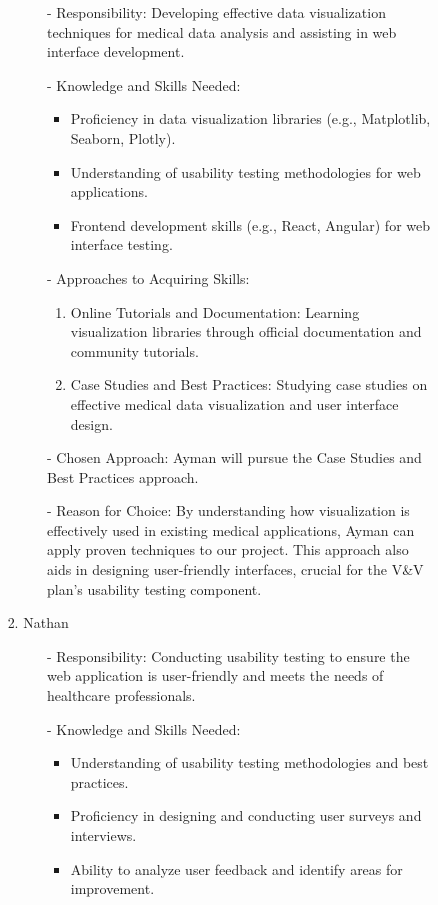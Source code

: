 \documentclass[12pt, titlepage]{article}
\begin{document}
\begin{enumerate}
\begin{enumerate}
\begin{enumerate}
\begin{enumerate}
  \begin{itemize}
      \item[-] Responsibility: Developing effective data visualization techniques for medical data analysis and assisting in web interface development.
      \item[-] Knowledge and Skills Needed:
      \begin{itemize}
          \item Proficiency in data visualization libraries (e.g., Matplotlib, Seaborn, Plotly).
          \item Understanding of usability testing methodologies for web applications.
          \item Frontend development skills (e.g., React, Angular) for web interface testing.
      \end{itemize}
      \item[-] Approaches to Acquiring Skills:
      \begin{enumerate}
          \item Online Tutorials and Documentation: Learning visualization libraries through official documentation and community tutorials.
          \item Case Studies and Best Practices: Studying case studies on effective medical data visualization and user interface design.
      \end{enumerate}
      \item[-] Chosen Approach: Ayman will pursue the Case Studies and Best Practices approach.
      \item[-] Reason for Choice: By understanding how visualization is effectively used in existing medical applications, Ayman can apply proven techniques to our project. This approach also aids in designing user-friendly interfaces, crucial for the V\&V plan's usability testing component.
  \end{itemize}

  \item Nathan 

  \begin{itemize}
      \item[-] Responsibility: Conducting usability testing to ensure the web application is user-friendly and meets the needs of healthcare professionals.
      
      \item[-]Knowledge and Skills Needed:
      \begin{itemize}
          \item Understanding of usability testing methodologies and best practices.
          \item Proficiency in designing and conducting user surveys and interviews.
          \item Ability to analyze user feedback and identify areas for improvement.
      \end{itemize}
      

\end{itemize}
\end{enumerate}
\end{enumerate}
\end{enumerate}
\end{enumerate}
\end{document}
